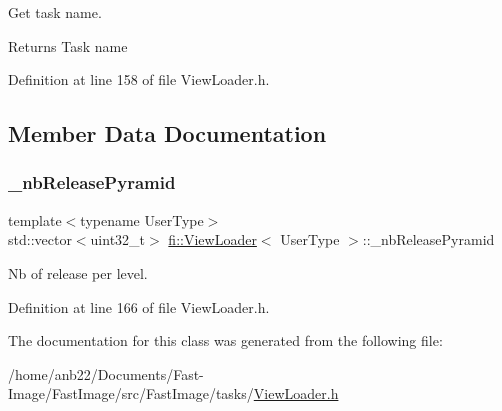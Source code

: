 Get task name. 

\begin{DoxyReturn}{Returns}
Task name 
\end{DoxyReturn}


Definition at line 158 of file View\+Loader.\+h.



\subsection{Member Data Documentation}
\mbox{\label{classfi_1_1ViewLoader_ab54e6c5792ff386f94cdaa685c438c50}} 
\subsubsection{\texorpdfstring{\+\_\+nb\+Release\+Pyramid}{\_nbReleasePyramid}}
{\footnotesize\ttfamily template$<$typename User\+Type$>$ \\
std\+::vector$<$uint32\+\_\+t$>$ \hyperlink{classfi_1_1ViewLoader}{fi\+::\+View\+Loader}$<$ User\+Type $>$\+::\+\_\+nb\+Release\+Pyramid\hspace{0.3cm}{\ttfamily [private]}}



Nb of release per level. 



Definition at line 166 of file View\+Loader.\+h.



The documentation for this class was generated from the following file\+:\begin{DoxyCompactItemize}
\item 
/home/anb22/\+Documents/\+Fast-\/\+Image/\+Fast\+Image/src/\+Fast\+Image/tasks/\hyperlink{ViewLoader_8h}{View\+Loader.\+h}\end{DoxyCompactItemize}
